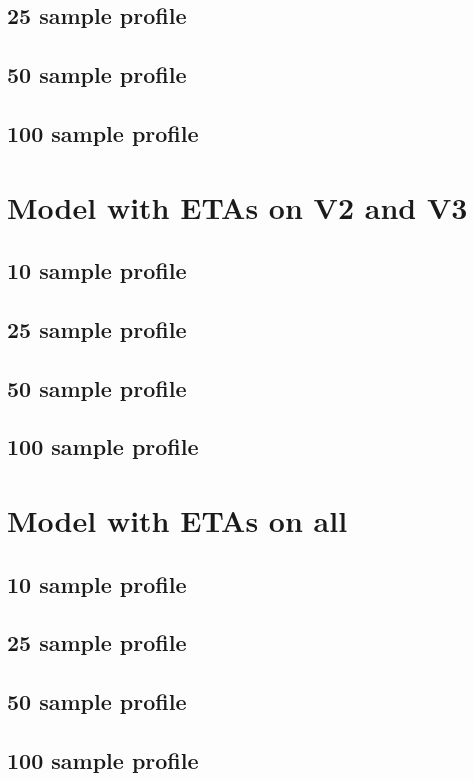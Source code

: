 \subsection{25 sample profile}
\subsection{50 sample profile}
\subsection{100 sample profile}

\section{Model with ETAs on V2 and V3}
\subsection{10 sample profile}
\subsection{25 sample profile}
\subsection{50 sample profile}
\subsection{100 sample profile}

\section{Model with ETAs on all}
\subsection{10 sample profile}
\subsection{25 sample profile}
\subsection{50 sample profile}
\subsection{100 sample profile}


